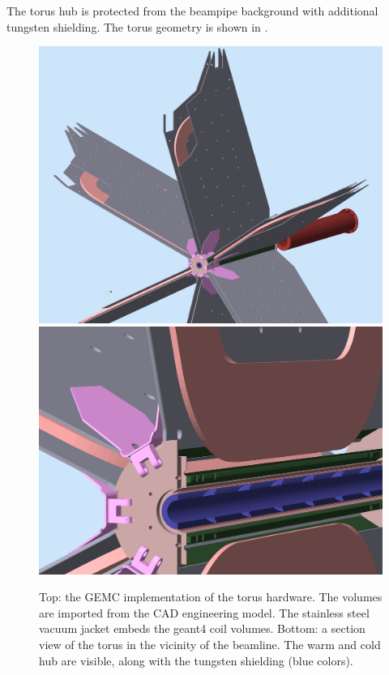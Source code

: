 The torus hub is protected from the beampipe background with additional tungsten shielding.
The torus geometry is shown in .

\begin{figure}
	\centering
	\includegraphics[width=0.99\columnwidth,keepaspectratio]{img/torusGeometry.png}
	\includegraphics[width=0.99\columnwidth,keepaspectratio]{img/torusDetail.png}
	\caption{Top: the GEMC implementation of the torus hardware. The volumes are imported from the CAD engineering model.
            The stainless steel vacuum jacket embeds the geant4 coil volumes.
				Bottom: a section view of the torus in the vicinity of the beamline. The warm and cold hub are visible, along with the
				tungsten shielding (blue colors).}
	\label{fig:torus}
\end{figure}


